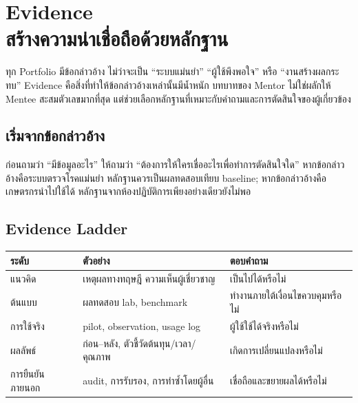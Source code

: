 \chapter{Evidence\\สร้างความน่าเชื่อถือด้วยหลักฐาน}

ทุก Portfolio มีข้อกล่าวอ้าง ไม่ว่าจะเป็น \enquote{ระบบแม่นยำ} \enquote{ผู้ใช้พึงพอใจ} หรือ \enquote{งานสร้างผลกระทบ} Evidence คือสิ่งที่ทำให้ข้อกล่าวอ้างเหล่านั้นมีน้ำหนัก บทบาทของ Mentor ไม่ใช่ผลักให้ Mentee สะสมตัวเลขมากที่สุด แต่ช่วยเลือกหลักฐานที่เหมาะกับคำถามและการตัดสินใจของผู้เกี่ยวข้อง


\section{เริ่มจากข้อกล่าวอ้าง}
ก่อนถามว่า \enquote{มีข้อมูลอะไร} ให้ถามว่า \enquote{ต้องการให้ใครเชื่ออะไรเพื่อทำการตัดสินใจใด} หากข้อกล่าวอ้างคือระบบตรวจโรคแม่นยำ หลักฐานควรเป็นผลทดสอบเทียบ baseline; หากข้อกล่าวอ้างคือเกษตรกรนำไปใช้ได้ หลักฐานจากห้องปฏิบัติการเพียงอย่างเดียวยังไม่พอ

\section{Evidence Ladder}
\begin{table}[ht]
\centering
\begin{tabularx}{\textwidth}{P{.23\textwidth}YP{.28\textwidth}}
\toprule
\textbf{ระดับ} & \textbf{ตัวอย่าง} & \textbf{ตอบคำถาม}\\
\midrule
แนวคิด & เหตุผลทางทฤษฎี ความเห็นผู้เชี่ยวชาญ & เป็นไปได้หรือไม่\\
ต้นแบบ & ผลทดสอบ lab, benchmark & ทำงานภายใต้เงื่อนไขควบคุมหรือไม่\\
การใช้จริง & pilot, observation, usage log & ผู้ใช้ใช้ได้จริงหรือไม่\\
ผลลัพธ์ & ก่อน--หลัง, ตัวชี้วัดต้นทุน/เวลา/คุณภาพ & เกิดการเปลี่ยนแปลงหรือไม่\\
การยืนยันภายนอก & audit, การรับรอง, การทำซ้ำโดยผู้อื่น & เชื่อถือและขยายผลได้หรือไม่\\
\bottomrule
\end{tabularx}
\end{table}


